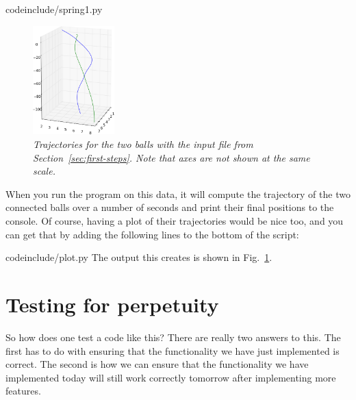 \documentclass{article}
\begin{document}

{codeinclude/spring1.py}

\begin{figure}
  \begin{center}
    \vspace*{-24pt}
    \includegraphics[width=0.28\textwidth]{figures/testcase-1.png}
    \vspace*{-12pt}
  \end{center}
  \caption{\it Trajectories for the two balls with the input file from
    Section~\ref{sec:first-steps}. Note that axes are not shown at the same
    scale.}
  \vspace*{-3mm}
  \label{fig:testcase-1}
\end{figure}

When you run the program on this data, it will compute the trajectory of the
two connected balls over a number of seconds and print their final positions
to the console.
Of course, having a plot of their trajectories would be nice too, and you can
get that by adding the following lines to the bottom of the script:

{codeinclude/plot.py}
The output this creates is shown in Fig.~\ref{fig:testcase-1}.


\section{Testing for perpetuity}
\label{sec:testing}


So how does one test a code like this? There are really two answers to
this. The first has to do with ensuring that the functionality we have just
implemented is correct. The second is how we can ensure that the functionality
we have implemented today will still work correctly tomorrow after
implementing more features.
\end{document}
